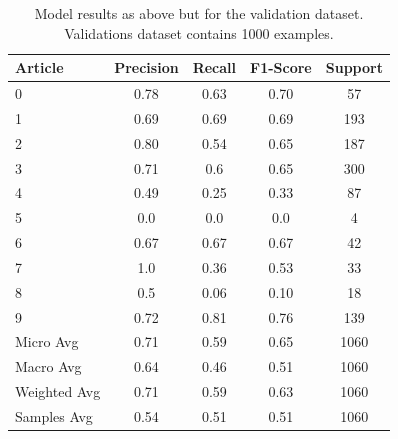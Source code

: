 \documentclass{article}
\begin{document}
\begin{table}[H]
    \centering
    \begin{tabular}{|l|c|c|c|c|}
    \hline
        Article & Precision & Recall & F1-Score & Support \\ \hline
        0 & 0.78 & 0.63 & 0.70 & 57 \\ \hline
        1 & 0.69 & 0.69 & 0.69 & 193 \\ \hline
        2 & 0.80 & 0.54 & 0.65 & 187 \\ \hline
        3 & 0.71 & 0.6 & 0.65 & 300 \\ \hline
        4 & 0.49 & 0.25 & 0.33 & 87 \\ \hline
        5 & 0.0 & 0.0 & 0.0 & 4 \\ \hline
        6 & 0.67 & 0.67 & 0.67 & 42 \\ \hline
        7 & 1.0 & 0.36 & 0.53 & 33 \\ \hline
        8 & 0.5 & 0.06 & 0.10 & 18 \\ \hline
        9 & 0.72 & 0.81 & 0.76 & 139 \\ \hline
        Micro Avg & 0.71 & 0.59 & 0.65 & 1060 \\ \hline
        Macro Avg & 0.64 & 0.46 & 0.51 & 1060 \\ \hline
        Weighted Avg & 0.71 & 0.59 & 0.63 & 1060 \\ \hline
        Samples Avg & 0.54 & 0.51 & 0.51 & 1060 \\ \hline
    \end{tabular}
    \caption{Model results as above but for the validation dataset. 
    Validations dataset contains 1000 examples.}
\end{table}

\newpage



    
\end{document}
